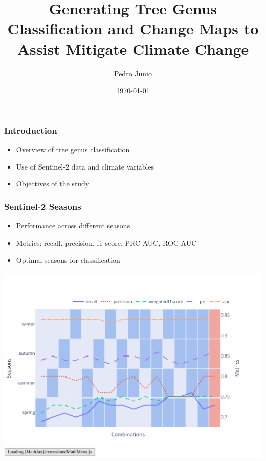 \documentclass[compress]{beamer}
\title{Generating Tree Genus Classification and Change Maps to Assist Mitigate Climate Change}
\author{Pedro Junio}
\date{\today}
\begin{document}
\frame{\titlepage}

\begin{frame}
\frametitle{Introduction}
\begin{itemize}
    \item Overview of tree genus classification
    \item Use of Sentinel-2 data and climate variables
    \item Objectives of the study
\end{itemize}
\end{frame}

\begin{frame}
\frametitle{Sentinel-2 Seasons}
\begin{itemize}
    \item Performance across different seasons
    \item Metrics: recall, precision, f1-score, PRC AUC, ROC AUC
    \item Optimal seasons for classification
\end{itemize}
\includegraphics[width=0.9\linewidth, trim={20pt 40pt 10pt 30pt}, clip]{../report/figures/figures_analysis/seasonal_selection.pdf}
\end{frame}
\end{document}

